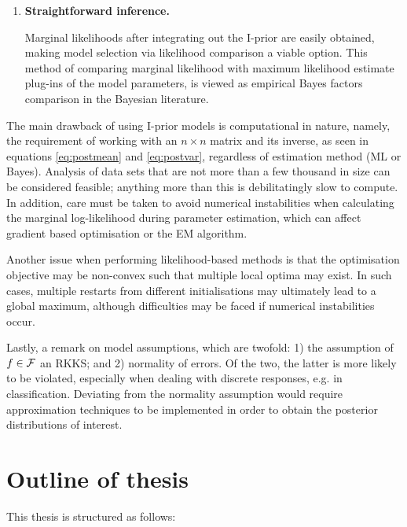 \documentclass[11pt,twoside,openright,showframe]{report}
\begin{document}
\begin{enumerate}
  \item \textbf{Straightforward inference.}
  
  Marginal likelihoods after integrating out the I-prior are easily obtained, making model selection via likelihood comparison a viable option.
  This method of comparing marginal likelihood with maximum likelihood estimate plug-ins of the model parameters, is viewed as empirical Bayes factors comparison in the Bayesian literature.
  
\end{enumerate}

The main drawback of using I-prior models is computational in nature, namely, the requirement of working with an $n \times n$ matrix and its inverse, as seen in equations \cref{eq:postmean} and \cref{eq:postvar}, regardless of estimation method (ML or Bayes).
Analysis of data sets that are not more than a few thousand in size can be considered feasible; anything more than this is debilitatingly slow to compute.
In addition, care must be taken to avoid numerical instabilities when calculating the marginal log-likelihood during parameter estimation, which can affect gradient based optimisation or the EM algorithm.

Another issue when performing likelihood-based methods is that the optimisation objective may be non-convex such that multiple local optima may exist. 
In such cases, multiple restarts from different initialisations may ultimately lead to a global maximum, although difficulties may be faced if numerical instabilities occur.

Lastly, a remark on model assumptions, which are twofold: 1) the assumption of $f \in {\mathcal F}$ an RKKS; and 2) normality of errors.
Of the two, the latter is more likely to be violated, especially when dealing with discrete responses, e.g. in classification.
Deviating from the normality assumption would require approximation techniques to be implemented in order to obtain the posterior distributions of interest.

\section{Outline of thesis}

This thesis is structured as follows:
\end{document}
